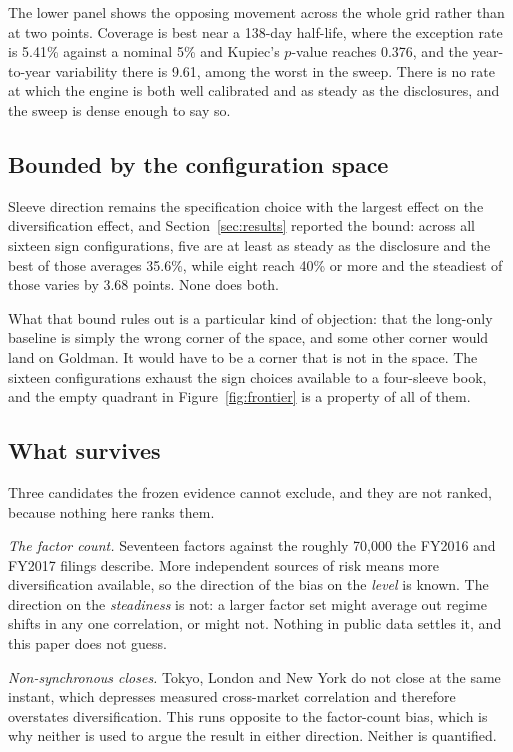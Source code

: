 The lower panel shows the opposing movement across the whole grid rather than
at two points. Coverage is best near a 138-day half-life, where the exception
rate is 5.41\% against a nominal 5\% and Kupiec's $p$-value reaches 0.376,
and the year-to-year variability there is 9.61, among the worst in the sweep.
There is no rate at which the engine is both well calibrated and as steady as
the disclosures, and the sweep is dense enough to say so.

\subsection{Bounded by the configuration space}

Sleeve direction remains the specification choice with the largest effect on
the diversification effect, and Section~\ref{sec:results} reported the bound:
across all sixteen sign configurations, five are at least as steady as the
disclosure and the best of those averages 35.6\%, while eight reach 40\% or
more and the steadiest of those varies by 3.68 points. None does both.

What that bound rules out is a particular kind of objection: that the long-only
baseline is simply the wrong corner of the space, and some other corner would
land on Goldman. It would have to be a corner that is not in the space. The
sixteen configurations exhaust the sign choices available to a four-sleeve
book, and the empty quadrant in Figure~\ref{fig:frontier} is a property of all
of them.

\subsection{What survives}

Three candidates the frozen evidence cannot exclude, and they are not ranked,
because nothing here ranks them.

\emph{The factor count.} Seventeen factors against the roughly 70,000 the
FY2016 and FY2017 filings describe. More independent sources of risk means more
diversification available, so the direction of the bias on the \emph{level} is
known. The direction on the \emph{steadiness} is not: a larger factor set might
average out regime shifts in any one correlation, or might not. Nothing in
public data settles it, and this paper does not guess.

\emph{Non-synchronous closes.} Tokyo, London and New York do not close at the
same instant, which depresses measured cross-market correlation and therefore
overstates diversification. This runs opposite to the factor-count bias, which
is why neither is used to argue the result in either direction. Neither is
quantified.

